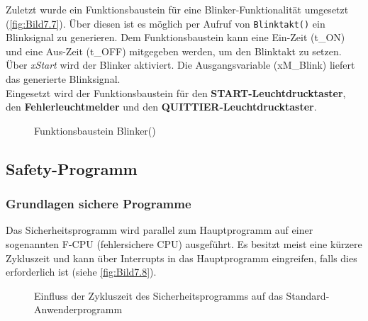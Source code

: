 Zuletzt wurde ein Funktionsbaustein für eine Blinker-Funktionalität umgesetzt (\autoref{fig:Bild7.7}). Über diesen ist es möglich per Aufruf von \texttt{Blinktakt()} ein Blinksignal zu generieren. Dem Funktionsbaustein kann eine Ein-Zeit (t\_ON) und eine Aus-Zeit (t\_OFF) mitgegeben werden, um den Blinktakt zu setzen. Über \textit{xStart} wird der Blinker aktiviert. Die Ausgangsvariable (xM\_Blink) liefert das generierte Blinksignal. \\
Eingesetzt wird der Funktionsbaustein für den \textbf{START-Leuchtdrucktaster}, den \textbf{Fehlerleuchtmelder} und den \textbf{QUITTIER-Leuchtdrucktaster}.

\begin{figure}[H]
   \centering
   \caption[Funktionsbaustein Blinker()]{Funktionsbaustein Blinker()}
   \label{fig:Bild7.7}
\end{figure}

\clearpage

\subsection{Safety-Programm}

\subsubsection{Grundlagen sichere Programme}

Das Sicherheitsprogramm wird parallel zum Hauptprogramm auf einer sogenannten F-CPU (fehlersichere CPU) ausgeführt. Es besitzt meist eine kürzere Zykluszeit und kann über Interrupts in das Hauptprogramm eingreifen, falls dies erforderlich ist (siehe \autoref{fig:Bild7.8}).

\begin{figure}[H]
   \centering
   \caption[Zykluszeit Sicherheitsprogramm]{Einfluss der Zykluszeit des Sicherheitsprogramms auf das Standard- Anwenderprogramm}
   \label{fig:Bild7.8}
\end{figure}

